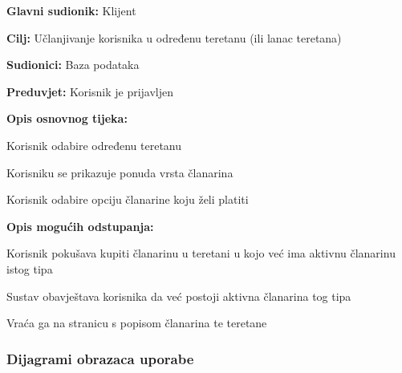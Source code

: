 					\noindent {}
					\begin{packed_item}
	
						\item \textbf{Glavni sudionik: }Klijent
						\item  \textbf{Cilj:} Učlanjivanje korisnika u određenu teretanu (ili lanac teretana)
						\item  \textbf{Sudionici:} Baza podataka
						\item  \textbf{Preduvjet:} Korisnik je prijavljen
						\item  \textbf{Opis osnovnog tijeka:}
						
						\item[] \begin{packed_enum}
	
							\item Korisnik odabire određenu teretanu
							\item Korisniku se prikazuje ponuda vrsta članarina
							\item Korisnik odabire opciju članarine koju želi platiti
						\end{packed_enum}
					
						\item  \textbf{Opis mogućih odstupanja:}
						
						\item[] \begin{packed_item}
	
						\item[-]
						Korisnik pokušava kupiti članarinu u teretani u kojo već ima aktivnu članarinu istog tipa
							\item[] \begin{packed_enum}
								
								\item Sustav obavještava korisnika da već postoji aktivna članarina tog tipa
								\item Vraća ga na stranicu s popisom članarina te teretane
							\end{packed_enum}
						\end{packed_item}
					\end{packed_item}
				
					
				\subsubsection{Dijagrami obrazaca uporabe}
					
